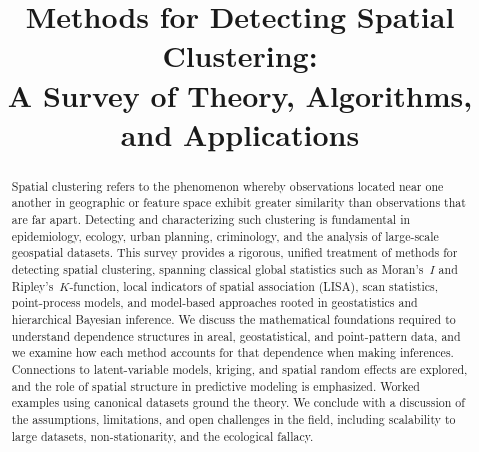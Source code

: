 \documentclass[conference]{IEEEtran}
\theoremstyle{definition}
\begin{document}
\title{Methods for Detecting Spatial Clustering:\\A Survey of Theory, Algorithms, and Applications}

\author{
\and
{}
}

\maketitle

\begin{abstract}
Spatial clustering refers to the phenomenon whereby observations located near one another in geographic or feature space exhibit greater similarity than observations that are far apart. Detecting and characterizing such clustering is fundamental in epidemiology, ecology, urban planning, criminology, and the analysis of large-scale geospatial datasets. This survey provides a rigorous, unified treatment of methods for detecting spatial clustering, spanning classical global statistics such as Moran's~$I$ and Ripley's~$K$-function, local indicators of spatial association (LISA), scan statistics, point-process models, and model-based approaches rooted in geostatistics and hierarchical Bayesian inference. We discuss the mathematical foundations required to understand dependence structures in areal, geostatistical, and point-pattern data, and we examine how each method accounts for that dependence when making inferences. Connections to latent-variable models, kriging, and spatial random effects are explored, and the role of spatial structure in predictive modeling is emphasized. Worked examples using canonical datasets ground the theory. We conclude with a discussion of the assumptions, limitations, and open challenges in the field, including scalability to large datasets, non-stationarity, and the ecological fallacy.
\end{abstract}
\end{document}
